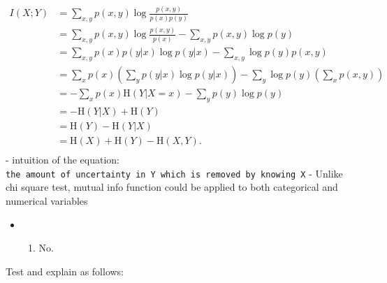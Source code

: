 \documentclass[11pt]{article}
\providecommand{\tightlist}{%
      \setlength{\itemsep}{0pt}\setlength{\parskip}{0pt}}
\begin{document}
\[{\displaystyle {\begin{aligned}I(X;Y)&{}=\sum _{x,y}p(x,y)\log {\frac {p(x,y)}{p(x)p(y)}}\\&{}=\sum _{x,y}p(x,y)\log {\frac {p(x,y)}{p(x)}}-\sum _{x,y}p(x,y)\log p(y)\\&{}=\sum _{x,y}p(x)p(y|x)\log p(y|x)-\sum _{x,y}\log p(y)p(x,y)\\&{}=\sum _{x}p(x)\left(\sum _{y}p(y|x)\log p(y|x)\right)-\sum _{y}\log p(y)\left(\sum _{x}p(x,y)\right)\\&{}=-\sum _{x}p(x)\mathrm {H} (Y|X=x)-\sum _{y}p(y)\log p(y)\\&{}=-\mathrm {H} (Y|X)+\mathrm {H} (Y)\\&{}=\mathrm {H} (Y)-\mathrm {H} (Y|X)\\&{}=\mathrm {H} (X)+ \mathrm{H}(Y) - \mathrm {H} (X, Y)
.\\\end{aligned}}}\] - intuition of the equation:
\texttt{the\ amount\ of\ uncertainty\ in\ Y\ which\ is\ removed\ by\ knowing\ X}
- Unlike chi square test, mutual info function could be applied to both
categorical and numerical variables

    \begin{itemize}
\item
  \begin{enumerate}
  \def\labelenumi{\alph{enumi})}
  \setcounter{enumi}{1}
  \tightlist
  \item
    No.
  \end{enumerate}
\end{itemize}

Test and explain as follows:
\end{document}
